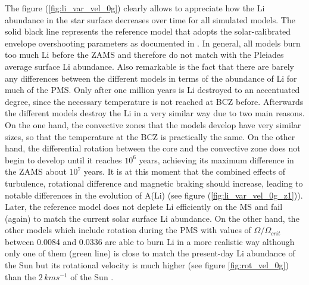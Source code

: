 \documentclass[fleqn,usenatbib]{mnras}
\begin{document}
The figure (\ref{fig:li_var_vel_0g}) clearly allows to appreciate how the Li abundance in the star surface decreases over time for all simulated models. The solid black line represents the reference model that adopts the solar-calibrated envelope overshooting parameters as documented in \citet{Choi2016}. In general, all models burn too much Li before the ZAMS and therefore do not match with the Pleiades average surface Li abundance. Also remarkable is the fact that there are barely any differences between the different models in terms of the abundance of Li for much of the PMS. Only after one million years is Li destroyed to an accentuated degree, since the necessary temperature is not reached at BCZ before. Afterwards the different models destroy the Li in a very similar way due to two main reasons. On the one hand, the convective zones that the models develop have very similar sizes, so that the temperature at the BCZ is practically the same. On the other hand, the differential rotation between the core and the convective zone does not begin to develop until it reaches $10^6$ years, achieving its maximum difference in the ZAMS about  $10^7$ years. It is at this moment that the combined effects of turbulence, rotational difference and magnetic braking should increase, leading to notable differences in the evolution of A(Li) (see figure (\ref{fig:li_var_vel_0g_z1})). Later, the reference model does not deplete Li efficiently on the MS and fail (again) to match the current solar surface Li abundance. On the other hand, the other models which include rotation during the PMS with values of $\Omega / \Omega_{crit}$ between 0.0084 and 0.0336 are able to burn Li in a more realistic way although only one of them (green line) is close to match the present-day Li abundance of the Sun but its rotational velocity is much higher (see figure \ref{fig:rot_vel_0g}) than the $2\,kms^{-1}$ of the Sun \citep{Gill2012}. \par
\end{document}
